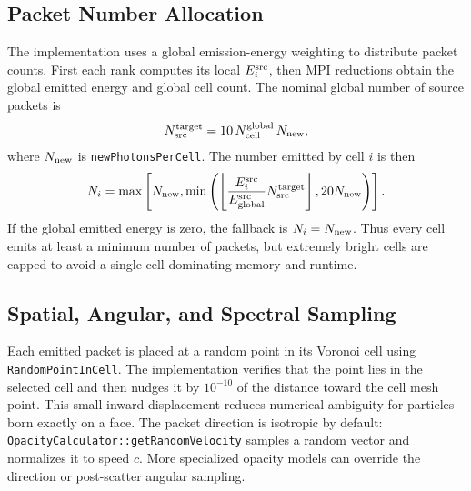 \documentclass[11pt]{article}
\begin{document}
\subsection{Packet Number Allocation}

The implementation uses a global emission-energy weighting to distribute
packet counts. First each rank computes its local \(E^{\rm src}_i\), then MPI
reductions obtain the global emitted energy and global cell count. The nominal
global number of source packets is
\begin{equation}
  N_{\rm src}^{\rm target}
  =
  10\,N_{\rm cell}^{\rm global}\,N_{\rm new},
\end{equation}
where \(N_{\rm new}\) is \texttt{newPhotonsPerCell}. The number emitted by
cell \(i\) is then
\begin{equation}
  N_i =
  \max\left[
    N_{\rm new},
    \min\left(
      \left\lfloor
      \frac{E^{\rm src}_i}{E^{\rm src}_{\rm global}}
      N_{\rm src}^{\rm target}
      \right\rfloor,
      20N_{\rm new}
    \right)
  \right].
  \label{eq:packet-count}
\end{equation}
If the global emitted energy is zero, the fallback is \(N_i=N_{\rm new}\).
Thus every cell emits at least a minimum number of packets, but extremely
bright cells are capped to avoid a single cell dominating memory and runtime.

\subsection{Spatial, Angular, and Spectral Sampling}

Each emitted packet is placed at a random point in its Voronoi cell using
\texttt{RandomPointInCell}. The implementation verifies that the point lies in
the selected cell and then nudges it by \(10^{-10}\) of the distance toward the
cell mesh point. This small inward displacement reduces numerical ambiguity for
particles born exactly on a face. The packet direction is isotropic by default:
\texttt{OpacityCalculator::getRandomVelocity} samples a random vector and
normalizes it to speed \(c\). More specialized opacity models can override the
direction or post-scatter angular sampling.
\end{document}
